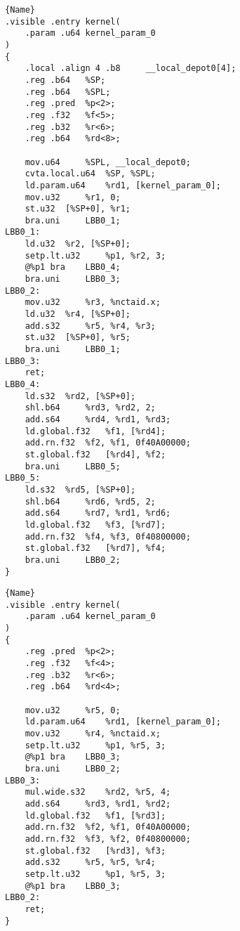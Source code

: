 \noindent\begin{minipage}{.45\paperwidth}
\begin{lstlisting}[caption=code 1,frame=tlrb]{Name}
.visible .entry kernel(
	.param .u64 kernel_param_0
)
{
	.local .align 4 .b8 	__local_depot0[4];
	.reg .b64 	%SP;
	.reg .b64 	%SPL;
	.reg .pred 	%p<2>;
	.reg .f32 	%f<5>;
	.reg .b32 	%r<6>;
	.reg .b64 	%rd<8>;

	mov.u64 	%SPL, __local_depot0;
	cvta.local.u64 	%SP, %SPL;
	ld.param.u64 	%rd1, [kernel_param_0];
	mov.u32 	%r1, 0;
	st.u32 	[%SP+0], %r1;
	bra.uni 	LBB0_1;
LBB0_1:
	ld.u32 	%r2, [%SP+0];
	setp.lt.u32 	%p1, %r2, 3;
	@%p1 bra 	LBB0_4;
	bra.uni 	LBB0_3;
LBB0_2:
	mov.u32 	%r3, %nctaid.x;
	ld.u32 	%r4, [%SP+0];
	add.s32 	%r5, %r4, %r3;
	st.u32 	[%SP+0], %r5;
	bra.uni 	LBB0_1;
LBB0_3:
	ret;
LBB0_4:
	ld.s32 	%rd2, [%SP+0];
	shl.b64 	%rd3, %rd2, 2;
	add.s64 	%rd4, %rd1, %rd3;
	ld.global.f32 	%f1, [%rd4];
	add.rn.f32 	%f2, %f1, 0f40A00000;
	st.global.f32 	[%rd4], %f2;
	bra.uni 	LBB0_5;
LBB0_5:
	ld.s32 	%rd5, [%SP+0];
	shl.b64 	%rd6, %rd5, 2;
	add.s64 	%rd7, %rd1, %rd6;
	ld.global.f32 	%f3, [%rd7];
	add.rn.f32 	%f4, %f3, 0f40800000;
	st.global.f32 	[%rd7], %f4;
	bra.uni 	LBB0_2;
}
\end{lstlisting}
\end{minipage}\hfill
\begin{minipage}{.45\paperwidth}
\begin{lstlisting}[caption=code 2,frame=tlrb]{Name}
.visible .entry kernel(
	.param .u64 kernel_param_0
)
{
	.reg .pred 	%p<2>;
	.reg .f32 	%f<4>;
	.reg .b32 	%r<6>;
	.reg .b64 	%rd<4>;

	mov.u32 	%r5, 0;
	ld.param.u64 	%rd1, [kernel_param_0];
	mov.u32 	%r4, %nctaid.x;
	setp.lt.u32 	%p1, %r5, 3;
	@%p1 bra 	LBB0_3;
	bra.uni 	LBB0_2;
LBB0_3:
	mul.wide.s32 	%rd2, %r5, 4;
	add.s64 	%rd3, %rd1, %rd2;
	ld.global.f32 	%f1, [%rd3];
	add.rn.f32 	%f2, %f1, 0f40A00000;
	add.rn.f32 	%f3, %f2, 0f40800000;
	st.global.f32 	[%rd3], %f3;
	add.s32 	%r5, %r5, %r4;
	setp.lt.u32 	%p1, %r5, 3;
	@%p1 bra 	LBB0_3;
LBB0_2:
	ret;
}

\end{lstlisting}
\end{minipage}